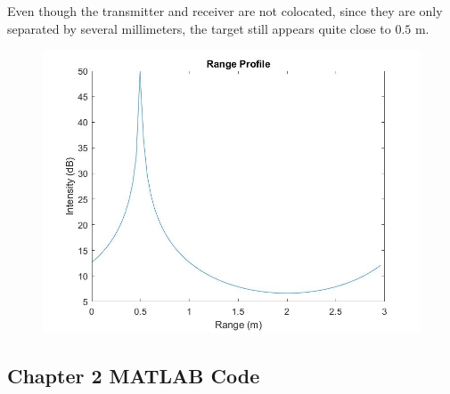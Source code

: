 

Even though the transmitter and receiver are not colocated, since they are only separated by several millimeters, the target still appears quite close to $0.5$ m.

\begin{figure}[h]
	\centering
	\includegraphics[width=0.7\linewidth]{chapters/chapter02/figures/range_profile}
	\caption{}
	\label{fig:range profile}
\end{figure}

\begin{subappendices}
	\section{Chapter 2 MATLAB Code}
	
\end{subappendices}














